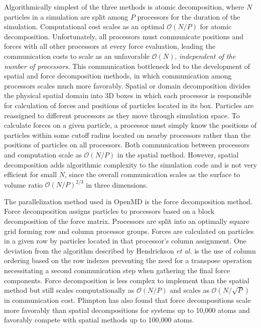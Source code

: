 \documentclass[letterpaper]{report}
\begin{document}
Algorithmically simplest of the three methods is atomic decomposition,
where $N$ particles in a simulation are split among $P$ processors for
the duration of the simulation. Computational cost scales as an
optimal $\mathcal{O}(N/P)$ for atomic decomposition. Unfortunately, all
processors must communicate positions and forces with all other
processors at every force evaluation, leading the communication costs
to scale as an unfavorable $\mathcal{O}(N)$, \emph{independent of the
number of processors}. This communication bottleneck led to the
development of spatial and force decomposition methods, in which
communication among processors scales much more favorably. Spatial or
domain decomposition divides the physical spatial domain into 3D boxes
in which each processor is responsible for calculation of forces and
positions of particles located in its box. Particles are reassigned to
different processors as they move through simulation space. To
calculate forces on a given particle, a processor must simply know the
positions of particles within some cutoff radius located on nearby
processors rather than the positions of particles on all
processors. Both communication between processors and computation
scale as $\mathcal{O}(N/P)$ in the spatial method. However, spatial
decomposition adds algorithmic complexity to the simulation code and
is not very efficient for small $N$, since the overall communication
scales as the surface to volume ratio $\mathcal{O}(N/P)^{2/3}$ in
three dimensions.

The parallelization method used in OpenMD is the force
decomposition method.\cite{hendrickson:95} Force decomposition assigns
particles to processors based on a block decomposition of the force
matrix. Processors are split into an optimally square grid forming row
and column processor groups. Forces are calculated on particles in a
given row by particles located in that processor's column
assignment. One deviation from the algorithm described by Hendrickson
{\it et al.} is the use of column ordering based on the row indexes
preventing the need for a transpose operation necessitating a second
communication step when gathering the final force components.  Force
decomposition is less complex to implement than the spatial method but
still scales computationally as $\mathcal{O}(N/P)$ and scales as
$\mathcal{O}(N/\sqrt{P})$ in communication cost. Plimpton has also
found that force decompositions scale more favorably than spatial
decompositions for systems up to 10,000 atoms and favorably compete
with spatial methods up to 100,000 atoms.\cite{plimpton95}
\end{document}
